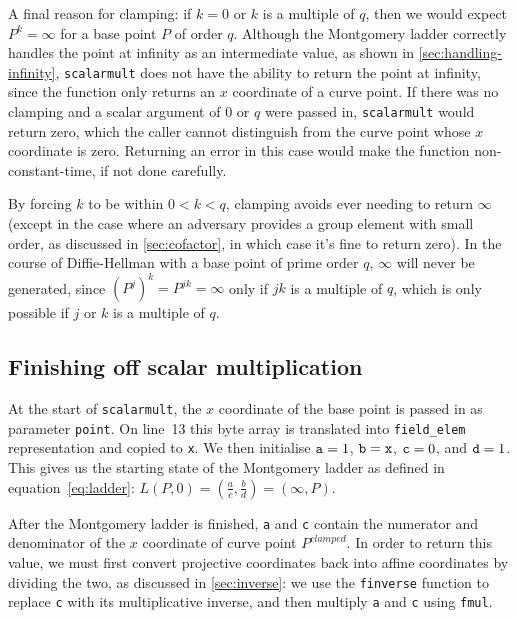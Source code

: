 \documentclass[manuscript]{acmart}
\begin{document}
A final reason for clamping: if $k=0$ or $k$ is a multiple of $q$, then we would expect $P^k = \infty$ for a base point $P$ of order $q$.
Although the Montgomery ladder correctly handles the point at infinity as an intermediate value, as shown in \autoref{sec:handling-infinity}, \verb|scalarmult| does not have the ability to return the point at infinity, since the function only returns an $x$ coordinate of a curve point.
If there was no clamping and a scalar argument of $0$ or $q$ were passed in, \verb|scalarmult| would return zero, which the caller cannot distinguish from the curve point whose $x$ coordinate is zero.
Returning an error in this case would make the function non-constant-time, if not done carefully.

By forcing $k$ to be within $0 < k < q$, clamping avoids ever needing to return $\infty$ (except in the case where an adversary provides a group element with small order, as discussed in \autoref{sec:cofactor}, in which case it's fine to return zero).
In the course of Diffie-Hellman with a base point of prime order $q$, $\infty$ will never be generated, since $(P^j)^k = P^{jk} = \infty$ only if $jk$ is a multiple of $q$, which is only possible if $j$ or $k$ is a multiple of $q$.

\subsection{Finishing off scalar multiplication}

At the start of \verb|scalarmult|, the $x$ coordinate of the base point is passed in as parameter \verb|point|.
On line~13 this byte array is translated into \verb|field_elem| representation and copied to \verb|x|.
We then initialise $\verb|a|=1$, $\verb|b|=\verb|x|$, $\verb|c|=0$, and $\verb|d|=1$.
This gives us the starting state of the Montgomery ladder as defined in equation~\eqref{eq:ladder}: $L(P, 0) = (\frac{a}{c}, \frac{b}{d}) = (\infty, P)$.

After the Montgomery ladder is finished, \verb|a| and \verb|c| contain the numerator and denominator of the $x$ coordinate of curve point $P^\mathit{clamped}$.
In order to return this value, we must first convert projective coordinates back into affine coordinates by dividing the two, as discussed in \autoref{sec:inverse}: we use the \verb|finverse| function to replace \verb|c| with its multiplicative inverse, and then multiply \verb|a| and \verb|c| using \verb|fmul|.
\end{document}
